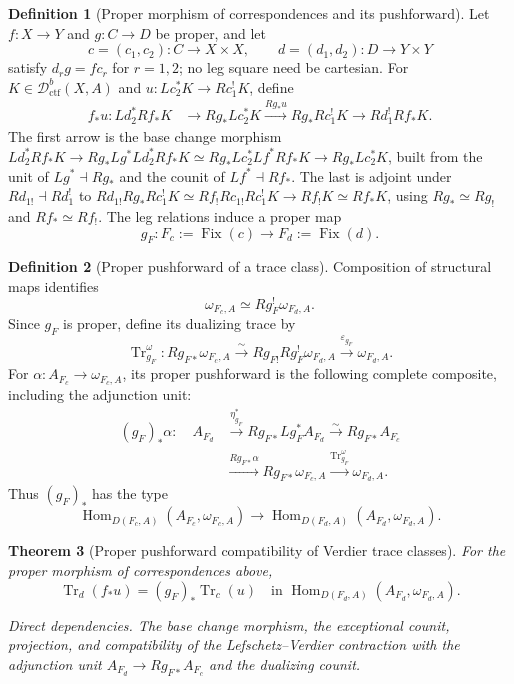 \documentclass[10pt]{article}
\newtheorem{theorem}{Theorem}[section]
\theoremstyle{definition}
\newtheorem{definition}[theorem]{Definition}
\newcommand{\Dctf}{\mathcal D^b_{\mathrm{ctf}}}
\newcommand{\Fix}{\operatorname{Fix}}
\newcommand{\Hom}{\operatorname{Hom}}
\newcommand{\depends}[1]{\par\smallskip\noindent\textit{Direct dependencies.} #1\par}
\begin{document}
\begin{definition}[Proper morphism of correspondences and its pushforward]
Let \(f:X\to Y\) and \(g:C\to D\) be proper, and let
\[
 c=(c_1,c_2):C\to X\times X,
 \qquad d=(d_1,d_2):D\to Y\times Y
\]
satisfy \(d_rg=fc_r\) for \(r=1,2\); no leg square need be cartesian.
For \(K\in\Dctf(X,A)\) and
\(u:Lc_2^*K\to Rc_1^!K\), define
\[
\begin{aligned}
 f_*u:Ld_2^*Rf_*K
 &\longrightarrow Rg_*Lc_2^*K
 \xrightarrow{Rg_*u}Rg_*Rc_1^!K
 \longrightarrow Rd_1^!Rf_*K.
\end{aligned}
\]
The first arrow is the base change morphism
\(Ld_2^*Rf_*K\to Rg_*Lg^*Ld_2^*Rf_*K\simeq Rg_*Lc_2^*Lf^*Rf_*K\to
Rg_*Lc_2^*K\), built from the unit of \(Lg^*\dashv Rg_*\) and the counit of
\(Lf^*\dashv Rf_*\).  The last is adjoint under
\(Rd_{1!}\dashv Rd_1^!\) to
\(Rd_{1!}Rg_*Rc_1^!K\simeq Rf_!Rc_{1!}Rc_1^!K\to Rf_!K\simeq Rf_*K\),
using \(Rg_*\simeq Rg_!\) and \(Rf_*\simeq Rf_!\).  The leg relations
induce a proper map
\[
 g_F:F_c:=\Fix(c)\longrightarrow F_d:=\Fix(d).
\]
\end{definition}

\begin{definition}[Proper pushforward of a trace class]
Composition of structural maps identifies
\[
 \omega_{F_c,A}\simeq Rg_F^!\omega_{F_d,A}.
\]
Since \(g_F\) is proper, define its dualizing trace by
\[
 \operatorname{Tr}_{g_F}^{\omega}:
 Rg_{F*}\omega_{F_c,A}
 \xrightarrow{\sim}Rg_{F!}Rg_F^!\omega_{F_d,A}
 \xrightarrow{\varepsilon_{g_F}}\omega_{F_d,A}.
\]
For
\(\alpha:A_{F_c}\to\omega_{F_c,A}\), its proper pushforward is the
following complete composite, including the adjunction unit:
\[
\begin{aligned}
 (g_F)_*\alpha:\quad A_{F_d}
 &\xrightarrow{\eta^*_{g_F}}
 Rg_{F*}Lg_F^*A_{F_d}
 \xrightarrow{\sim}Rg_{F*}A_{F_c}\\
 &\xrightarrow{Rg_{F*}\alpha}Rg_{F*}\omega_{F_c,A}
 \xrightarrow{\operatorname{Tr}_{g_F}^{\omega}}\omega_{F_d,A}.
\end{aligned}
\]
Thus \((g_F)_*\) has the type
\[
 \Hom_{D(F_c,A)}(A_{F_c},\omega_{F_c,A})
 \longrightarrow
 \Hom_{D(F_d,A)}(A_{F_d},\omega_{F_d,A}).
\]
\end{definition}

\begin{theorem}[Proper pushforward compatibility of Verdier trace classes]
For the proper morphism of correspondences above,
\[
 \operatorname{Tr}_d(f_*u)=(g_F)_*\operatorname{Tr}_c(u)
 \quad\text{in }\Hom_{D(F_d,A)}(A_{F_d},\omega_{F_d,A}).
\]
\depends{The base change morphism, the exceptional counit,
projection, and compatibility of the Lefschetz--Verdier contraction with the
adjunction unit \(A_{F_d}\to Rg_{F*}A_{F_c}\) and the dualizing counit.}
\end{theorem}
\end{document}
